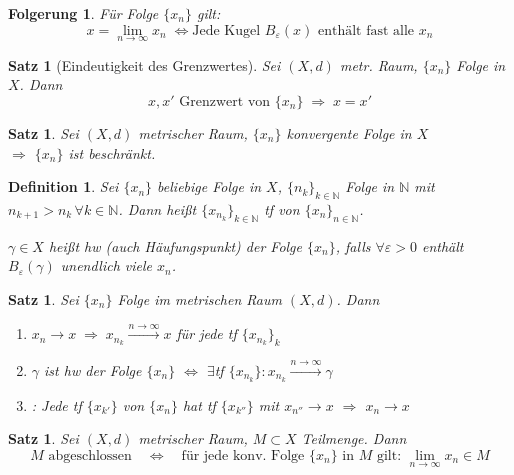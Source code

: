 \documentclass[ngerman,a4paper]{report}
\theoremstyle{break}
\newtheorem{satz}[theorem]{Satz}
\newtheorem*{definition}{Definition}
\newtheorem{conclusion}[theorem]{Folgerung}
\renewcommand{\epsilon}{\varepsilon}
\begin{document}
\begin{conclusion}
	Für Folge $\{x_n\}$ gilt: \[ x=\lim\limits_{n\rightarrow\infty}x_n \;\Leftrightarrow \text{Jede Kugel $B_\epsilon(x)$ enthält fast alle $x_n$} \]
\end{conclusion}
\addtocounter{theorem}{4}
\begin{satz}[Eindeutigkeit des Grenzwertes]
	Sei $(X,d)$ metr. Raum, $\{x_n\}$ Folge in $X$. Dann \[ x,x' \text{ Grenzwert von $\{x_n\}$} \;\Rightarrow\; x = x' \]
\end{satz}
\begin{satz}
	Sei $(X,d)$ metrischer Raum, $\{x_n\}$ konvergente Folge in $X$\\
    $\Rightarrow$ $\{x_n\}$ ist beschränkt.
\end{satz}
\addtocounter{theorem}{4}
\begin{definition}
	Sei $\{x_n\}$ beliebige Folge in $X$, $\{n_k\}_{k\in\mathbb{N}}$ Folge in $\mathbb{N}$ mit $n_{k+1} > n_k\,\forall k\in\mathbb{N}$. Dann heißt $\{x_{n_k}\}_{k\in\mathbb{N}}$ \gls{tf} von $\{x_n\}_{n\in\mathbb{N}}$.
	
	$\gamma\in X$ heißt \gls{hw} (auch Häufungspunkt) der Folge $\{x_n\}$, falls $\forall \epsilon > 0$ enthält $B_\epsilon(\gamma)$ unendlich viele $x_n$.
\end{definition}
\begin{satz}\label{tfprinzip}
	Sei $\{x_n\}$ Folge im metrischen Raum $(X,d)$. Dann
	\begin{enumerate}[label={\arabic*)}]
		\item $x_n\rightarrow x \;\Rightarrow\; x_{n_k} \overset{n\rightarrow\infty}{\longrightarrow} x$ für jede \gls{tf} $\{x_{n_k}\}_k$
		\item $\gamma$ ist \gls{hw} der Folge $\{x_n\}$ $\Leftrightarrow$ $\exists$\gls{tf} $\{x_{n_k}\}: x_{n_k} \overset{n\rightarrow\infty}{\longrightarrow} \gamma$
		\item {}: Jede \gls{tf} $\{x_{k'}\}$ von $\{x_n\}$ hat \gls{tf} $\{x_{k''}\}$ mit $x_{n''}\rightarrow x$ $\Rightarrow$ $x_n \rightarrow x$
	\end{enumerate}
\end{satz}
\begin{satz}
	Sei $(X,d)$ metrischer Raum, $M\subset X$ Teilmenge. Dann
	\[ M\text{ abgeschlossen} \quad\Leftrightarrow\quad \text{für jede konv. Folge $\{x_n\}$ in $M$ gilt: }\lim\limits_{n\rightarrow\infty} x_n\in M \]
\end{satz}
\end{document}
